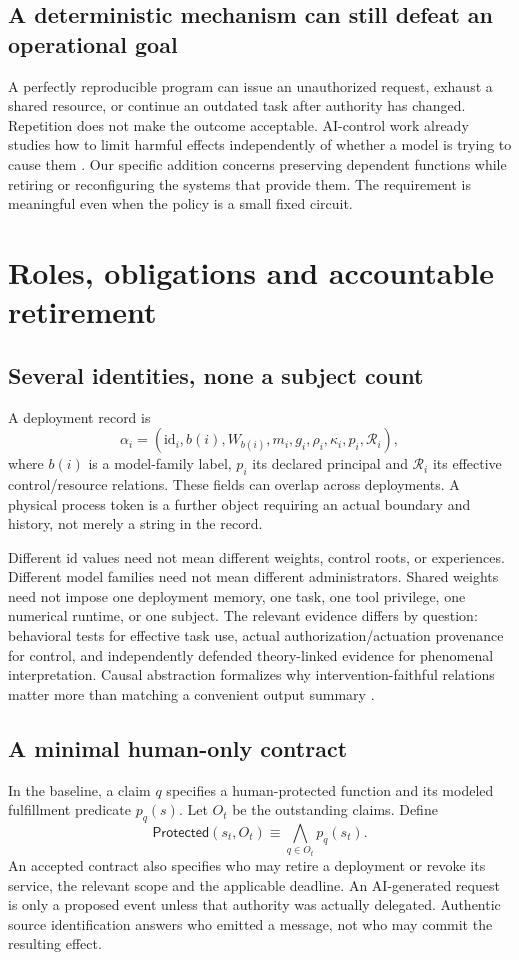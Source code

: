 \documentclass[11pt,a4paper]{article}
\theoremstyle{definition}\newtheorem{definition}{Definition}
\begin{document}
\subsection{A deterministic mechanism can still defeat an operational goal}
A perfectly reproducible program can issue an unauthorized request, exhaust a shared resource, or continue an outdated task after authority has changed. Repetition does not make the outcome acceptable. AI-control work already studies how to limit harmful effects independently of whether a model is trying to cause them \cite{greenblatt}. Our specific addition concerns preserving dependent functions while retiring or reconfiguring the systems that provide them. The requirement is meaningful even when the policy is a small fixed circuit.

\section{Roles, obligations and accountable retirement}
\label{sec:objects}
\subsection{Several identities, none a subject count}
A deployment record is
\[
\alpha_i=(\mathrm{id}_i,b(i),W_{b(i)},m_i,g_i,\rho_i,\kappa_i,p_i,\mathcal R_i),
\]
where $b(i)$ is a model-family label, $p_i$ its declared principal and $\mathcal R_i$ its effective control/resource relations. These fields can overlap across deployments. A physical process token is a further object requiring an actual boundary and history, not merely a string in the record.

Different $\mathrm{id}$ values need not mean different weights, control roots, or experiences. Different model families need not mean different administrators. Shared weights need not impose one deployment memory, one task, one tool privilege, one numerical runtime, or one subject. The relevant evidence differs by question: behavioral tests for effective task use, actual authorization/actuation provenance for control, and independently defended theory-linked evidence for phenomenal interpretation. Causal abstraction formalizes why intervention-faithful relations matter more than matching a convenient output summary \cite{geiger}.

\subsection{A minimal human-only contract}
In the baseline, a claim $q$ specifies a human-protected function and its modeled fulfillment predicate $p_q(s)$. Let $O_t$ be the outstanding claims. Define
\begin{equation}
\mathsf{Protected}(s_t,O_t)\equiv\bigwedge_{q\in O_t}p_q(s_t).
\label{eq:protected}
\end{equation}
An accepted contract also specifies who may retire a deployment or revoke its service, the relevant scope and the applicable deadline. An AI-generated request is only a proposed event unless that authority was actually delegated. Authentic source identification answers who emitted a message, not who may commit the resulting effect.
\end{document}
